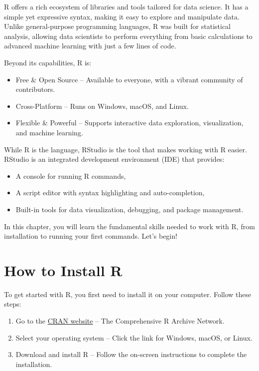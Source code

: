 \documentclass[
]{book}
\providecommand{\tightlist}{%
  \setlength{\itemsep}{0pt}\setlength{\parskip}{0pt}}
\theoremstyle{definition}
\theoremstyle{definition}
\theoremstyle{definition}
\theoremstyle{definition}
\theoremstyle{remark}
\begin{document}
R offers a rich ecosystem of libraries and tools tailored for data science. It has a simple yet expressive syntax, making it easy to explore and manipulate data. Unlike general-purpose programming languages, R was built for statistical analysis, allowing data scientists to perform everything from basic calculations to advanced machine learning with just a few lines of code.

Beyond its capabilities, R is:

\begin{itemize}
\tightlist
\item
  Free \& Open Source -- Available to everyone, with a vibrant community of contributors.\\
\item
  Cross-Platform -- Runs on Windows, macOS, and Linux.\\
\item
  Flexible \& Powerful -- Supports interactive data exploration, visualization, and machine learning.
\end{itemize}

While R is the language, RStudio is the tool that makes working with R easier. RStudio is an integrated development environment (IDE) that provides:

\begin{itemize}
\tightlist
\item
  A console for running R commands,\\
\item
  A script editor with syntax highlighting and auto-completion,\\
\item
  Built-in tools for data visualization, debugging, and package management.
\end{itemize}

In this chapter, you will learn the fundamental skills needed to work with R, from installation to running your first commands. Let's begin! 🚀

\section{How to Install R}\label{how-to-install-r}

To get started with R, you first need to install it on your computer. Follow these steps:

\begin{enumerate}
\def\labelenumi{\arabic{enumi}.}
\tightlist
\item
  Go to the \href{https://cran.r-project.org}{CRAN website} -- The Comprehensive R Archive Network.\\
\item
  Select your operating system -- Click the link for Windows, macOS, or Linux.\\
\item
  Download and install R -- Follow the on-screen instructions to complete the installation.
\end{enumerate}
\end{document}
